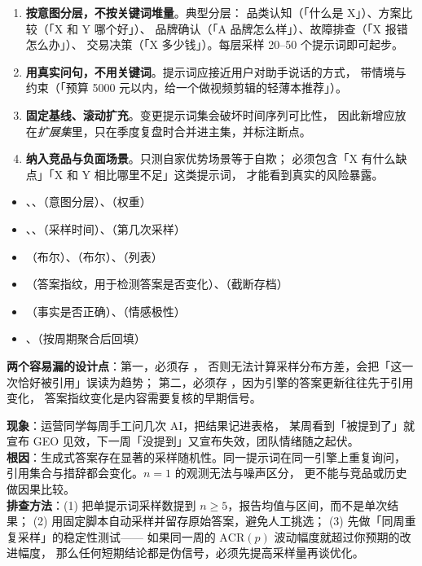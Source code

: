 \begin{enumerate}
  \item \textbf{按意图分层，不按关键词堆量}。典型分层：
        品类认知（「什么是 X」）、方案比较（「X 和 Y 哪个好」）、
        品牌确认（「A 品牌怎么样」）、故障排查（「X 报错怎么办」）、
        交易决策（「X 多少钱」）。每层采样 20--50 个提示词即可起步。
  \item \textbf{用真实问句，不用关键词}。提示词应接近用户对助手说话的方式，
        带情境与约束（「预算 5000 元以内，给一个做视频剪辑的轻薄本推荐」）。
  \item \textbf{固定基线、滚动扩充}。变更提示词集会破坏时间序列可比性，
        因此新增应放在\emph{扩展集}里，只在季度复盘时合并进主集，并标注断点。
  \item \textbf{纳入竞品与负面场景}。只测自家优势场景等于自欺；
        必须包含「X 有什么缺点」「X 和 Y 相比哪里不足」这类提示词，
        才能看到真实的风险暴露。
\end{enumerate}

\begin{toolbox}[AI 可见性监测表的最小字段设计]
\begin{itemize}
  \item {}、、（意图分层）、（权重）
  \item {}、、（采样时间）、（第几次采样）
  \item {}（布尔）、（布尔）、（列表）
  \item {}（答案指纹，用于检测答案是否变化）、（截断存档）
  \item {}（事实是否正确）、（情感极性）
  \item {}、（按周期聚合后回填）
\end{itemize}
\textbf{两个容易漏的设计点}：第一，必须存 ，
否则无法计算采样分布方差，会把「这一次恰好被引用」误读为趋势；
第二，必须存 ，因为引擎的答案更新往往先于引用变化，
答案指纹变化是内容需要复核的早期信号。
\end{toolbox}

\begin{pitfall}[用单次采样做趋势判断]
\textbf{现象}：运营同学每周手工问几次 AI，把结果记进表格，
某周看到「被提到了」就宣布 GEO 见效，下一周「没提到」又宣布失效，团队情绪随之起伏。\\
\textbf{根因}：生成式答案存在显著的采样随机性。同一提示词在同一引擎上重复询问，
引用集合与措辞都会变化。$n=1$ 的观测无法与噪声区分，
更不能与竞品或历史做因果比较。\\
\textbf{排查方法}：(1) 把单提示词采样数提到 $n \ge 5$，报告均值与区间，而不是单次结果；
(2) 用固定脚本自动采样并留存原始答案，避免人工挑选；
(3) 先做「同周重复采样」的稳定性测试——
如果同一周的 $\mathrm{ACR}(p)$ 波动幅度就超过你预期的改进幅度，
那么任何短期结论都是伪信号，必须先提高采样量再谈优化。
\end{pitfall}

